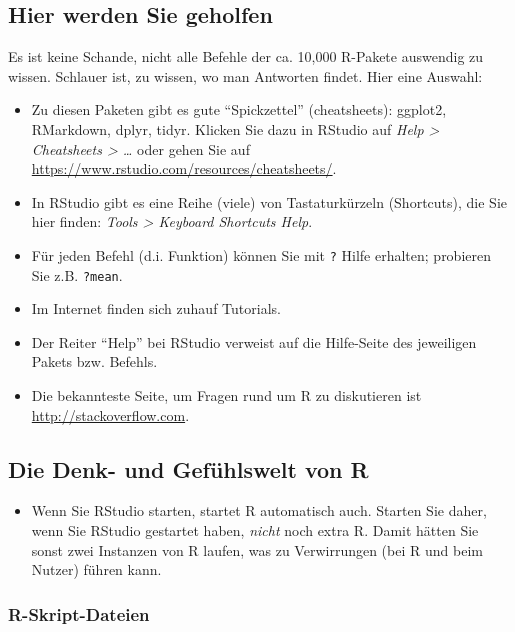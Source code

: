 \documentclass[12pt,ngerman,]{book}
\providecommand{\tightlist}{%
  \setlength{\itemsep}{0pt}\setlength{\parskip}{0pt}}
\begin{document}
\subsection{Hier werden Sie geholfen}\label{hier-werden-sie-geholfen}

Es ist keine Schande, nicht alle Befehle der ca. 10,000 R-Pakete
auswendig zu wissen. Schlauer ist, zu wissen, wo man Antworten findet.
Hier eine Auswahl:

\begin{itemize}
\item
  Zu diesen Paketen gibt es gute ``Spickzettel'' (cheatsheets): ggplot2,
  RMarkdown, dplyr, tidyr. Klicken Sie dazu in RStudio auf \emph{Help
  \textgreater{} Cheatsheets \textgreater{} \ldots{}} oder gehen Sie auf
  \url{https://www.rstudio.com/resources/cheatsheets/}.
\item
  In RStudio gibt es eine Reihe (viele) von Tastaturkürzeln (Shortcuts),
  die Sie hier finden: \emph{Tools \textgreater{} Keyboard Shortcuts
  Help}.
\item
  Für jeden Befehl (d.i. Funktion) können Sie mit \texttt{?} Hilfe
  erhalten; probieren Sie z.B. \texttt{?mean}.
\item
  Im Internet finden sich zuhauf Tutorials.
\item
  Der Reiter ``Help'' bei RStudio verweist auf die Hilfe-Seite des
  jeweiligen Pakets bzw. Befehls.
\item
  Die bekannteste Seite, um Fragen rund um R zu diskutieren ist
  \url{http://stackoverflow.com}.
\end{itemize}

\subsection{Die Denk- und Gefühlswelt von
R}\label{die-denk--und-gefuhlswelt-von-r}

\begin{itemize}
\tightlist
\item
  Wenn Sie RStudio starten, startet R automatisch auch. Starten Sie
  daher, wenn Sie RStudio gestartet haben, \emph{nicht} noch extra R.
  Damit hätten Sie sonst zwei Instanzen von R laufen, was zu
  Verwirrungen (bei R und beim Nutzer) führen kann.
\end{itemize}

\subsubsection{R-Skript-Dateien}\label{r-skript-dateien}
\end{document}
